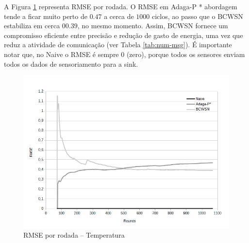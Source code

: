 \documentclass{acm_proc_article-sp}
\begin{document}
A Figura \ref{fig:rmse} representa RMSE por rodada. O RMSE em Adaga-P * 
abordagem tende a ficar muito perto de $0.47$ a cerca de $1000$ ciclos,
ao passo que o BCWSN estabiliza em cerca $00.39$, no mesmo momento.
Assim, BCWSN fornece um compromisso eficiente entre precisão e redução
de gasto de energia, uma vez que reduz a atividade de comunicação
(ver Tabela \ref{tab:num-msg}). É importante notar que, no Naive 
o RMSE é sempre 0 (zero), porque todos os sensores enviam todos os dados
de sensoriamento para a sink.
\vspace*{-.3cm}

\begin{figure}[!htb]
\begin{center}
	\includegraphics[scale=0.4]{BCWSN-RMSExRound-PB-Temp.png}
	 \vspace*{-.5cm}
	\caption{RMSE por rodada – Temperatura}
    \label{fig:rmse}
\end{center}
\end{figure}
\vspace*{-.3cm}
\end{document}
